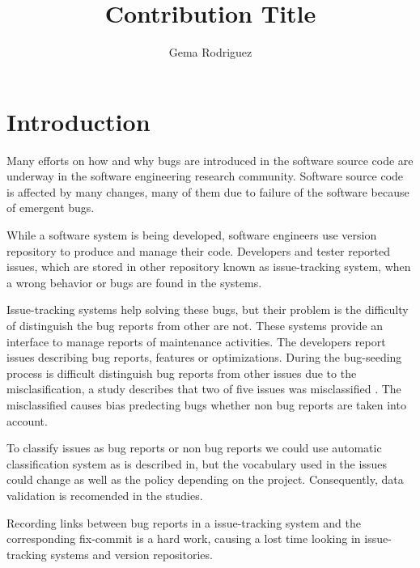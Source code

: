 \documentclass[ifip]{svmult}
\begin{document}
\title*{Contribution Title}
\author{Gema Rodriguez}
 \institute{}
%
%
\maketitle
\section{Introduction} 
\label{sec:1}

Many efforts on how and why bugs are introduced in the software source code are underway in the software engineering research community. Software source code is affected by many changes, many of them due to failure of the software because of emergent bugs. 

While a software system is being developed, software engineers use version repository to produce and manage their code. Developers and tester reported issues, which are stored in other repository known as issue-tracking system, when a wrong behavior or bugs are found in the systems.

Issue-tracking systems help solving these bugs, but their problem is the difficulty of distinguish the bug reports from other are not. These systems provide an interface to manage reports of maintenance activities. The developers report issues describing bug reports, features or optimizations. During the bug-seeding process is difficult distinguish bug reports from other issues due to the misclasification, a study describes that two of five issues was misclassified \cite{Herzig}. The misclassified causes bias predecting bugs whether non bug reports are taken into account.

To classify issues as bug reports or non bug reports we could use automatic classification system as is described in\cite{Antoniol}, but the vocabulary used in the issues could change as well as the policy depending on the project. Consequently, data validation is recomended in the studies\cite{Herzig}. 

Recording links between bug reports in a issue-tracking system and the corresponding fix-commit is a hard work, causing a lost time looking in issue-tracking systems and version repositories.
\end{document}

